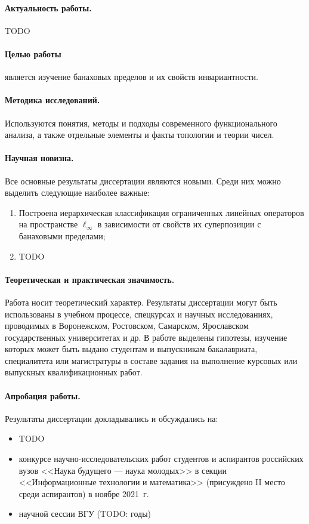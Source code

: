 \paragraph{Актуальность работы.}
TODO


\paragraph{Целью работы}
является изучение банаховых пределов и их свойств инвариантности.

\paragraph{Методика исследований.}
Используются понятия, методы и подходы современного функционального анализа,
а также отдельные элементы и факты топологии и теории чисел.


\paragraph{Научная новизна.}
Все основные результаты диссертации являются новыми.
Среди них можно выделить следующие наиболее важные:
\begin{enumerate}
	\item
		Построена иерархическая классификация ограниченных линейных операторов
		на пространстве $\ell_\infty$ в зависимости от свойств их суперпозиции с банаховыми пределами;
	\item
		TODO
\end{enumerate}


\paragraph{Теоретическая и практическая значимость.}
Работа носит теоретический характер.
Результаты диссертации могут быть использованы в учебном процессе, спецкурсах и научных исследованиях,
проводимых в Воронежском, Ростовском, Самарском, Ярославском государственных университетах и др.
В работе выделены гипотезы, изучение которых может быть выдано студентам и выпускникам бакалавриата, специалитета или магистратуры
в составе задания на выполнение курсовых или выпускных квалификационных работ.


\paragraph{Апробация работы.}
Результаты диссертации докладывались и обсуждались на:
\begin{itemize}
	\item TODO
	\item
		конкурсе научно-исследовательских работ студентов и аспирантов российских вузов
		<<Наука будущего --- наука молодых>> в секции <<Информационные технологии и математика>>
		(присуждено II место среди аспирантов) в ноябре 2021~г.
	\item научной сессии ВГУ (TODO: годы)
\end{itemize}


